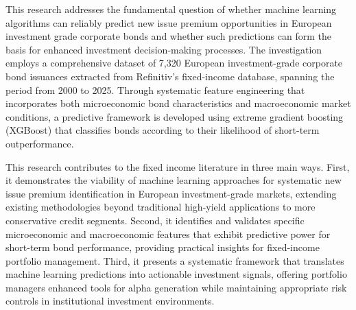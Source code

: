 This research addresses the fundamental question of whether machine learning algorithms can reliably predict new issue premium opportunities in European investment grade corporate bonds and whether such predictions can form the basis for enhanced investment decision-making processes. The investigation employs a comprehensive dataset of 7,320 European investment-grade corporate bond issuances extracted from Refinitiv's fixed-income database, spanning the period from 2000 to 2025. Through systematic feature engineering that incorporates both microeconomic bond characteristics and macroeconomic market conditions, a predictive framework is developed using extreme gradient boosting (XGBoost) that classifies bonds according to their likelihood of short-term outperformance.

This research contributes to the fixed income literature in three main ways. First, it demonstrates the viability of machine learning approaches for systematic new issue premium identification in European investment-grade markets, extending existing methodologies beyond traditional high-yield applications to more conservative credit segments. Second, it identifies and validates specific microeconomic and macroeconomic features that exhibit predictive power for short-term bond performance, providing practical insights for fixed-income portfolio management. Third, it presents a systematic framework that translates machine learning predictions into actionable investment signals, offering portfolio managers enhanced tools for alpha generation while maintaining appropriate risk controls in institutional investment environments.